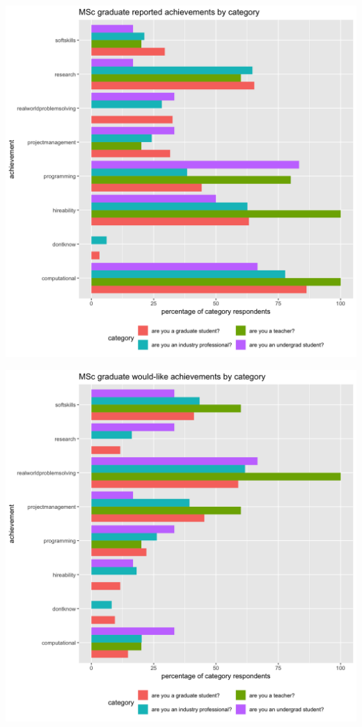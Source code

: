 \documentclass{sigchi}
\begin{document}
\includegraphics[scale=0.2]{../data-analysis/plots_output/MSc_graduate_reported_achievements_by_category.png}

\includegraphics[scale=0.2]{../data-analysis/plots_output/MSc_graduate_would-like_achievements_by_category.png}
\end{document}
